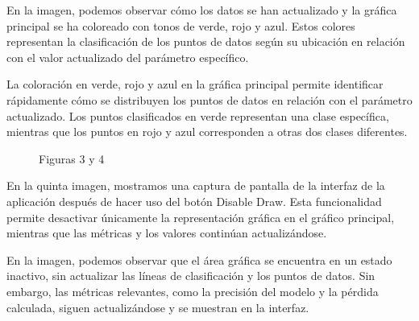 \documentclass[twoside,10pt]{article}
\numberwithin{equation}{section}
\begin{document}
En la imagen, podemos observar cómo los datos se han actualizado y la gráfica principal se ha coloreado con tonos de verde, rojo y azul. Estos colores representan la clasificación de los puntos de datos según su ubicación en relación con el valor actualizado del parámetro específico.

La coloración en verde, rojo y azul en la gráfica principal permite identificar rápidamente cómo se distribuyen los puntos de datos en relación con el parámetro actualizado. Los puntos clasificados en verde representan una clase específica, mientras que los puntos en rojo y azul corresponden a otras dos clases diferentes.
\begin{figure}
    \centering
    \hspace{1cm}
    \caption{Figuras 3 y 4}
\end{figure}







En la quinta imagen, mostramos una captura de pantalla de la interfaz de la aplicación después de hacer uso del botón Disable Draw. Esta funcionalidad permite desactivar únicamente la representación gráfica en el gráfico principal, mientras que las métricas y los valores continúan actualizándose.

En la imagen, podemos observar que el área gráfica se encuentra en un estado inactivo, sin actualizar las líneas de clasificación y los puntos de datos. Sin embargo, las métricas relevantes, como la precisión del modelo y la pérdida calculada, siguen actualizándose y se muestran en la interfaz.
\end{document}

